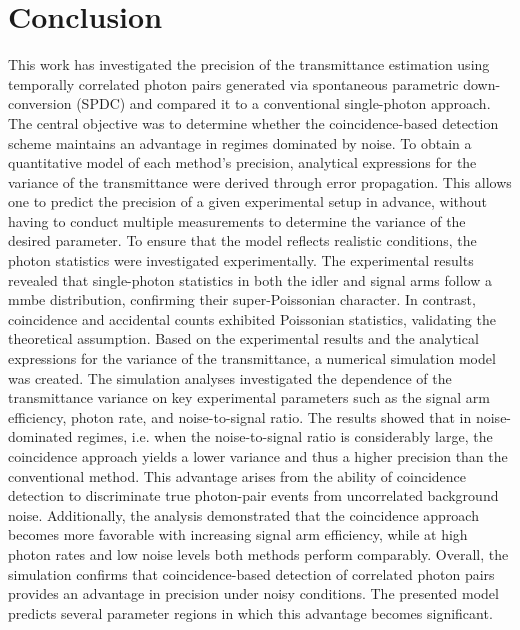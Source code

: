 \section{Conclusion}
This work has investigated the precision of the transmittance estimation using temporally correlated photon pairs generated via spontaneous parametric down-conversion (SPDC) and compared it to a conventional single-photon approach. The central objective was to determine whether the coincidence-based detection scheme maintains an advantage in regimes dominated by noise. \newline
To obtain a quantitative model of each method’s precision, analytical expressions for the variance of the transmittance were derived through error propagation. This allows one to predict the precision of a given experimental setup in advance, without having to conduct multiple measurements to determine the variance of the desired parameter. To ensure that the model reflects realistic conditions, the photon statistics were investigated experimentally. \newline
The experimental results revealed that single-photon statistics in both the idler and signal arms follow a \acrshort{mmbe} distribution, confirming their super-Poissonian character. In contrast, coincidence and accidental counts exhibited Poissonian statistics, validating the theoretical assumption. Based on the experimental results and the analytical expressions for the variance of the transmittance, a numerical simulation model was created. \newline
The simulation analyses investigated the dependence of the transmittance variance on key experimental parameters such as the signal arm efficiency, photon rate, and noise-to-signal ratio. The results showed that in noise-dominated regimes, i.e. when the noise-to-signal ratio is considerably large, the coincidence approach yields a lower variance and thus a higher precision than the conventional method. This advantage arises from the ability of coincidence detection to discriminate true photon-pair events from uncorrelated background noise. Additionally, the analysis demonstrated that the coincidence approach becomes more favorable with increasing signal arm efficiency, while at high photon rates and low noise levels both methods perform comparably. \newline
Overall, the simulation confirms that coincidence-based detection of correlated photon pairs provides an advantage in precision under noisy conditions. The presented model predicts several parameter regions in which this advantage becomes significant. \newline 
